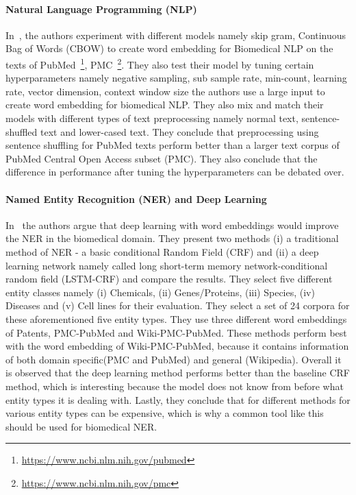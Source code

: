\paragraph{Natural Language Programming (NLP)}
In~\cite{chiu2016train}, the authors experiment with different models namely skip gram, Continuous Bag of Words (CBOW)  to create word embedding for Biomedical NLP on the texts of PubMed~\footnote{\url{https://www.ncbi.nlm.nih.gov/pubmed}}, PMC~\footnote{\url{https://www.ncbi.nlm.nih.gov/pmc}}. They also test their model by tuning certain hyperparameters namely negative sampling, sub sample rate, min-count, learning rate, vector dimension, context window size the authors use a large input to create word embedding for biomedical NLP. They also mix and match their models with different types of text preprocessing namely normal text, sentence-shuffled text and lower-cased text. They conclude that preprocessing using sentence shuffling for PubMed texts perform better than a larger text corpus of PubMed Central Open Access subset (PMC). They also conclude that the difference in performance after tuning the hyperparameters can be debated over. 

\paragraph{Named Entity Recognition (NER) and Deep Learning}
In~\cite{habibi2017deep} the authors argue that deep learning with word embeddings would improve the NER in the biomedical domain. They present two methods (i) a traditional method of NER - a basic conditional Random Field (CRF) and (ii) a deep learning network namely called long short-term memory network-conditional random field (LSTM-CRF) and compare the results. They select five different entity classes namely (i) Chemicals, (ii) Genes/Proteins, (iii) Species, (iv) Diseases and (v) Cell lines for their evaluation. They select a set of 24 corpora for these aforementioned five entity types. They use three different word embeddings of Patents, PMC-PubMed and Wiki-PMC-PubMed. These methods perform best with the word embedding of Wiki-PMC-PubMed, because it contains information of both domain specific(PMC and PubMed) and general (Wikipedia). Overall it is observed that the deep learning method performs better than the baseline CRF method, which is interesting because the model does not know from before what entity types it is dealing with. 
Lastly, they conclude that for different methods for various entity types can be expensive, which is why a common tool like this should be used for biomedical NER. 

